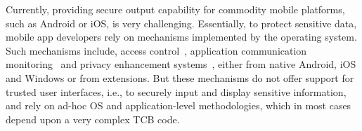 
Currently, providing secure output capability for commodity mobile platforms, such as Android or iOS, is very challenging. Essentially, to protect sensitive data, mobile app developers rely on mechanisms implemented by the operating system. Such mechanisms include, access control~\cite{smalley2013security,bugiel2011practical,nauman2010apex,kern2012permission,conti2011crepe,russello2012moses,heuser2014asm,backes2014android,wang2015deepdroid,drm}, application communication monitoring~\cite{ongtang2012semantically,dietz2011quire,bugiel2011xmandroid} and privacy enhancement systems~\cite{beresford2011mockdroid,zhou2011taming,shebaro2014identidroid.enck2014taintdroid}, either from native Android, iOS and Windows or from extensions. But these mechanisms do not offer support for trusted user interfaces, i.e., to securely input and display sensitive information, and rely on ad-hoc \ac{OS} and application-level methodologies, which in most cases depend upon a very complex \ac{TCB} code.

